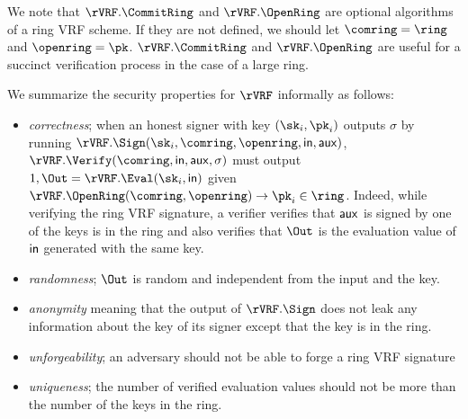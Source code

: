 We note that $ \rVRF.\CommitRing $ and $  \rVRF.\OpenRing $ are optional algorithms of a ring VRF scheme. If they are not defined, we should let $ \comring = \ring $ and $ \openring  = \pk$. $ \rVRF.\CommitRing $ and $  \rVRF.\OpenRing $ are useful for a succinct verification process in the case of a large ring.

We summarize the  security properties for $ \rVRF $  informally as follows: 
\begin{itemize}
	\item \emph{correctness}; when an honest signer with key $ (\sk_i,\pk_i) $ outputs $ \sigma $ by running $ \rVRF.\Sign(\sk_i, \comring,\openring, \msg, \aux) $, $ \rVRF.\Verify(\comring,\msg,\aux,\sigma)  $ must output $ 1,\Out = \rVRF.\Eval(\sk_i, \msg) $ given  $ \rVRF.\OpenRing(\comring,\openring) \rightarrow \pk_i \in \ring$. Indeed, while verifying the ring VRF signature, a verifier verifies that $ \mathsf{aux} $ is signed by one of the keys is in the ring and also verifies that  $ \Out $ is the evaluation value of $ \mathsf{in} $ generated with the same key. 
	\item \emph{randomness}; $ \Out $ is random and independent from the input and the  key.
	\item   \emph{anonymity} meaning that the output of $ \rVRF.\Sign $ does not leak any information about the key of its signer except that the key is in the ring.
	\item \emph{unforgeability}; an adversary should not be able to forge a ring VRF signature 
	\item  \emph{uniqueness}; the number of verified evaluation values should not be more than the number of the keys in the ring.
\end{itemize}






